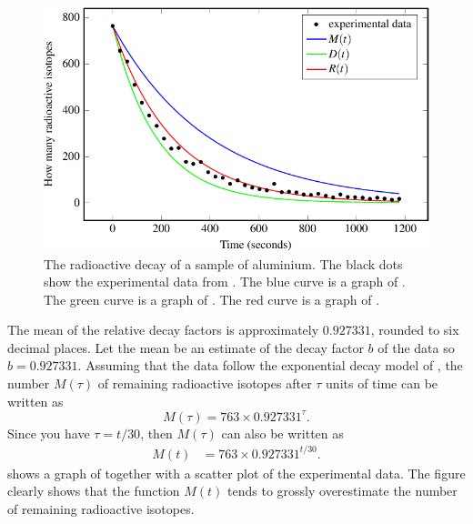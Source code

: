 \documentclass[a4paper,oneside,12pt]{article}
\begin{document}
\begin{problem}
{\begin{solution}
\begin{figure}[!htbp]
\centering
\includegraphics[scale=1.1]{image/11/aluminium.pdf}
\caption{%
  The radioactive decay of a sample of aluminium.  The black dots show
  the experimental data from
  .  The blue curve
  is a graph of
  .  The green
  curve is a graph of
  .  The red
  curve is a graph of
  .
}
\label{fig:exponential:aluminium_radioactive_decay}
\end{figure}

The mean of the relative decay factors is approximately $0.927331$,
rounded to six decimal places.  Let the mean be an estimate of the
decay factor $b$ of the data so $b = 0.927331$.  Assuming that the
data follow the exponential decay model of
, the number $M(\tau)$ of
remaining radioactive isotopes after $\tau$ units of time can be
written as
\[
M(\tau)
=
763 \times 0.927331^{\tau}.
\]
Since you have $\tau = t / 30$, then $M(\tau)$ can also be written as
\begin{equation}
\label{eqn:exponential:aluminium_mean_decay_factor}
\begin{aligned}
M(t)
&=
763 \times 0.927331^{t / 30}.
\end{aligned}
\end{equation}
 shows a graph of
 together with a
scatter plot of the experimental data.  The figure clearly shows that
the function $M(t)$ tends to grossly overestimate the number of
remaining radioactive isotopes.


\end{solution}}
\end{problem}
\end{document}

